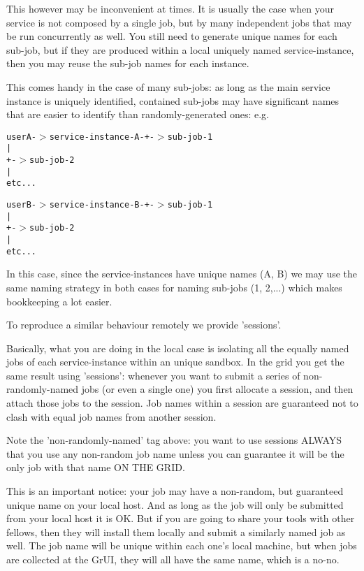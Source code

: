 This however may be inconvenient at times. It is usually the case when your service is not composed by a single job, but by many independent jobs that may be run concurrently as well. You still need to generate unique names for each sub-job, but if they are produced within a local uniquely named service-instance, then you may reuse the sub-job names for each instance.

This comes handy in the case of many sub-jobs: as long as the main service instance is uniquely identified, contained sub-jobs may have significant names that are easier to identify than randomly-generated ones: e.g. \small\begin{alltt}
    user A -$>$ service-instance-A -+-$>$ sub-job-1
                                  |
                                  +-$>$ sub-job-2
                                  |
                                  etc...\end{alltt}\normalsize 


\small\begin{alltt}    user B -$>$ service-instance-B -+-$>$ sub-job-1
                                  |
                                  +-$>$ sub-job-2
                                  |
                                  etc...
 \end{alltt}\normalsize 
 In this case, since the service-instances have unique names (A, B) we may use the same naming strategy in both cases for naming sub-jobs (1, 2,...) which makes bookkeeping a lot easier.

To reproduce a similar behaviour remotely we provide 'sessions'.

Basically, what you are doing in the local case is isolating all the equally named jobs of each service-instance within an unique sandbox. In the grid you get the same result using 'sessions': whenever you want to submit a series of non-randomly-named jobs (or even a single one) you first allocate a session, and then attach those jobs to the session. Job names within a session are guaranteed not to clash with equal job names from another session.

Note the 'non-randomly-named' tag above: you want to use sessions ALWAYS that you use any non-random job name unless you can guarantee it will be the only job with that name ON THE GRID.

This is an important notice: your job may have a non-random, but guaranteed unique name on your local host. And as long as the job will only be submitted from your local host it is OK. But if you are going to share your tools with other fellows, then they will install them locally and submit a similarly named job as well. The job name will be unique within each one's local machine, but when jobs are collected at the Gr\-UI, they will all have the same name, which is a no-no.

